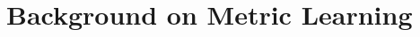 \documentclass[twoside,11pt]{article}
\newcommand{\aurelien}[1]{\todo[inline,caption={},color=orange!40]{{\it Aurelien:~}#1}}
\begin{document}


\section{Background on Metric Learning} \label{metriclearning}






\end{document}

